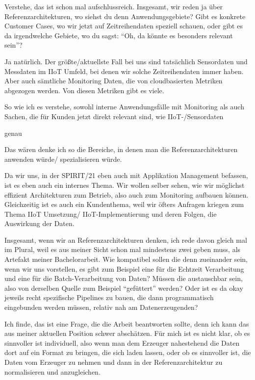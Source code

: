 \LF	 Verstehe, das ist schon mal aufschlussreich. Insgesamt, wir reden ja über Referenzarchitekturen, wo siehst du denn Anwendungsgebiete? Gibt es konkrete Customer Cases, wo wir jetzt auf Zeitreihendaten speziell schauen, oder gibt es da irgendwelche Gebiete, wo du sagst: \enquote{Oh, da könnte es besonders relevant sein}?

\PA	 Ja natürlich. Der größte/aktuellste Fall bei uns sind tatsächlich Sensordaten und Messdaten im \ac{IIoT} Umfeld, bei denen wir solche Zeitreihendaten immer haben. Aber auch sämtliche Monitoring Daten, die von cloudbasierten Metriken abgezogen werden. Von diesen Metriken gibt es viele.

\LF	So wie ich es verstehe, sowohl interne Anwendungsfälle mit Monitoring als auch Sachen, die für Kunden jetzt direkt relevant sind, wie \ac{IIoT}-/Sensordaten

\PA	 genau

\LF	 Das wären denke ich so die Bereiche, in denen man die Referenzarchitekturen anwenden würde/ spezialisieren würde.

\PA	 Da wir uns, in der SPIRIT/21 eben auch mit Applikation Management befassen, ist es eben auch ein internes Thema. Wir wollen selber sehen, wie wir möglichst effizient Architekturen zum Betrieb, also auch zum Monitoring aufbauen können. Gleichzeitig ist es auch ein Kundenthema, weil wir öfters Anfragen kriegen zum Thema \ac{IIoT} Umsetzung/ \ac{IIoT}-Implementierung und deren Folgen, die Auswirkung der Daten.

\LF	Insgesamt, wenn wir an Referenzarchitekturen denken, ich rede davon gleich mal im Plural, weil es aus meiner Sicht schon mal mindestens zwei geben muss, als Artefakt meiner Bachelorarbeit. Wie kompatibel sollen die denn zueinander sein, wenn wir uns vorstellen, es gibt zum Beispiel eine für die Echtzeit Verarbeitung und eine für die Batch-Verarbeitung von Daten? Müssen die austauschbar sein, also von derselben Quelle zum Beispiel \enquote{gefüttert} werden? Oder ist es da okay jeweils recht spezifische Pipelines zu bauen, die  dann programmatisch eingebunden werden müssen, relativ nah am Datenerzeugenden?

\PA	 Ich finde, das ist eine Frage, die die Arbeit beantworten sollte, denn ich kann das aus meiner aktuellen Position schwer abschätzen. Für mich ist es nicht klar, ob es sinnvoller ist individuell, also wenn man dem Erzeuger nahestehend die Daten dort auf ein Format zu bringen, die sich laden lassen, oder ob es sinnvoller ist, die Daten vom Erzeuger zu nehmen und dann in der Referenzarchitektur zu normalisieren und anzugleichen.

